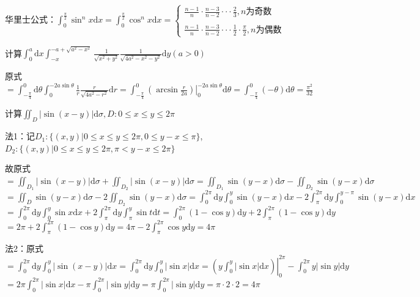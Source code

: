 \begin{xiti}
\begin{solution}
		\begin{conclusion}
			华里士公式：$\int_{0}^{\frac{\pi}{2}} \sin^{n} x \mathrm{d} x = \int_{0}^{\frac{\pi}{2}} \cos^{n} x \mathrm{d} x = \left\{\begin{array}{l}{\frac{n-1}{n} \cdot \frac{n-3}{n-2} \cdot \cdot \cdot \frac{2}{3} , n  \text{为奇数}} \\\\ {\frac{n-1}{n} \cdot \frac{n-3}{n-2} \cdot \cdot \cdot \frac{1}{2} \cdot \frac{\pi}{2} , n \text{为偶数}}\end{array}\right.$
		\end{conclusion}
	\end{solution}
	\item 计算$\int_{0}^{a} \mathrm{d} x \int_{-x}^{-a+\sqrt{a^{2}-x^{2}}} \frac{1}{\sqrt{x^{2}+y^{2}}} \frac{1}{\sqrt{4 a^{2}-x^{2}-y^{2}}} \mathrm{d} y (a>0)$
	\begin{solution}
		原式$=\int_{-\frac{\pi}{4}}^{0} \mathrm{d} \theta \int_{0}^{-2 a \sin \theta} \frac{1}{r} \frac{r}{\sqrt{4 a^{2}-r^{2}}} \mathrm{d} r=\int_{-\frac{\pi}{4}}^{0}\left.\left(\arcsin \frac{r}{2 a}\right)\right|_{0} ^{-2 a \sin \theta} \mathrm{d} \theta=\int_{-\frac{\pi}{4}}^{0}(-\theta) \mathrm{d} \theta=\frac{\pi^{2}}{32}$
	\end{solution}
	\item 计算$\iint_{D} |\sin (x-y) | \mathrm{d} \sigma, D : 0 \leqslant x \leqslant y \leqslant 2 \pi$
	\begin{solution}
		法1：记$D_{1} :\{(x, y) | 0 \leq x \leq y \leq 2 \pi, 0 \leq y-x \leq \pi\}$,$D_{2} :\{(x, y) | 0 \leq x \leq y \leq 2 \pi, \pi<y-x \leq 2 \pi\}$
		
		故原式$=\iint_{D_{1}}|\sin (x-y)| \mathrm{d} \sigma+\iint_{D_{2}}|\sin (x-y)| \mathrm{d} \sigma=\iint_{D_{1}} \sin (y-x) \mathrm{d} \sigma-\iint_{D_{2}} \sin (y-x) \mathrm{d} \sigma$
		$=\iint_{D} \sin (y-x) \mathrm{d} \sigma-2 \iint_{D_{2}} \sin (y-x) \mathrm{d} \sigma=\int_{0}^{2 \pi} \mathrm{d} y \int_{0}^{y} \sin (y-x) \mathrm{d} x-2 \int_{\pi}^{2 \pi} \mathrm{d} y \int_{0}^{y-\pi} \sin (y-x) \mathrm{d} x$
		$=\int_{0}^{2 \pi} \mathrm{d} y \int_{0}^{y} \sin x \mathrm{d} x+2 \int_{\pi}^{2 \pi} \mathrm{d} y \int_{\pi}^{y} \sin t \mathrm{d} t=\int_{0}^{2 \pi}(1-\cos y) \mathrm{d} y+2 \int_{\pi}^{2 \pi}(1-\cos y) \mathrm{d} y$
		$=2 \pi+2 \int_{\pi}^{2 \pi}(1-\cos y) \mathrm{d} y=4 \pi-2 \int_{\pi}^{2 \pi} \cos y \mathrm{d} y=4 \pi$
		
		法2：原式$=\int_{0}^{2 \pi} \mathrm{d} y \int_{0}^{y}|\sin (x-y)| \mathrm{d} x=\int_{0}^{2 \pi} \mathrm{d} y \int_{0}^{y}|\sin x| \mathrm{d} x=\left.\left(y \int_{0}^{y}|\sin x| \mathrm{d} x\right)\right|_{0} ^{2 \pi}-\int_{0}^{2 \pi} y|\sin y| \mathrm{d} y$
		$=2 \pi \int_{0}^{2 \pi}|\sin x| \mathrm{d} x-\pi \int_{0}^{2 \pi}|\sin y| \mathrm{d} y=\pi \int_{0}^{2 \pi}|\sin y| \mathrm{d} y=\pi \cdot 2 \cdot 2=4 \pi$
		

\end{solution}
\end{xiti}
